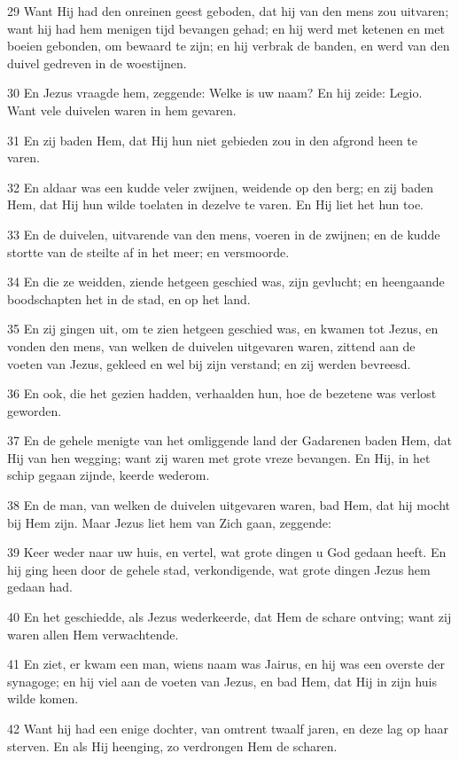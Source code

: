 \par 29 Want Hij had den onreinen geest geboden, dat hij van den mens zou uitvaren; want hij had hem menigen tijd bevangen gehad; en hij werd met ketenen en met boeien gebonden, om bewaard te zijn; en hij verbrak de banden, en werd van den duivel gedreven in de woestijnen.
\par 30 En Jezus vraagde hem, zeggende: Welke is uw naam? En hij zeide: Legio. Want vele duivelen waren in hem gevaren.
\par 31 En zij baden Hem, dat Hij hun niet gebieden zou in den afgrond heen te varen.
\par 32 En aldaar was een kudde veler zwijnen, weidende op den berg; en zij baden Hem, dat Hij hun wilde toelaten in dezelve te varen. En Hij liet het hun toe.
\par 33 En de duivelen, uitvarende van den mens, voeren in de zwijnen; en de kudde stortte van de steilte af in het meer; en versmoorde.
\par 34 En die ze weidden, ziende hetgeen geschied was, zijn gevlucht; en heengaande boodschapten het in de stad, en op het land.
\par 35 En zij gingen uit, om te zien hetgeen geschied was, en kwamen tot Jezus, en vonden den mens, van welken de duivelen uitgevaren waren, zittend aan de voeten van Jezus, gekleed en wel bij zijn verstand; en zij werden bevreesd.
\par 36 En ook, die het gezien hadden, verhaalden hun, hoe de bezetene was verlost geworden.
\par 37 En de gehele menigte van het omliggende land der Gadarenen baden Hem, dat Hij van hen wegging; want zij waren met grote vreze bevangen. En Hij, in het schip gegaan zijnde, keerde wederom.
\par 38 En de man, van welken de duivelen uitgevaren waren, bad Hem, dat hij mocht bij Hem zijn. Maar Jezus liet hem van Zich gaan, zeggende:
\par 39 Keer weder naar uw huis, en vertel, wat grote dingen u God gedaan heeft. En hij ging heen door de gehele stad, verkondigende, wat grote dingen Jezus hem gedaan had.
\par 40 En het geschiedde, als Jezus wederkeerde, dat Hem de schare ontving; want zij waren allen Hem verwachtende.
\par 41 En ziet, er kwam een man, wiens naam was Jairus, en hij was een overste der synagoge; en hij viel aan de voeten van Jezus, en bad Hem, dat Hij in zijn huis wilde komen.
\par 42 Want hij had een enige dochter, van omtrent twaalf jaren, en deze lag op haar sterven. En als Hij heenging, zo verdrongen Hem de scharen.
